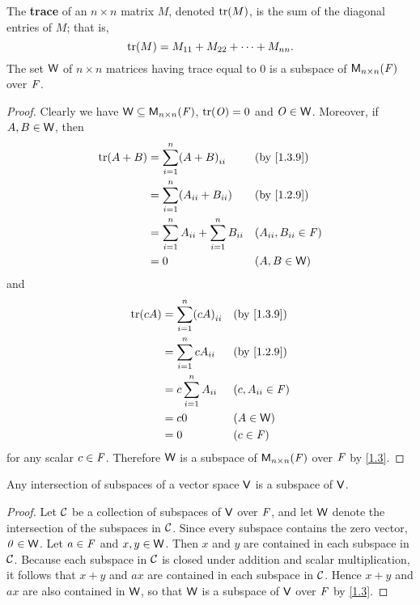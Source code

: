 \begin{eg}\label{1.3.9}
  The \textbf{trace} of an \(n \times n\) matrix \(M\), denoted \(\tr{M}\), is the sum of the diagonal entries of \(M\);
  that is,
  \[
    \tr{M} = M_{1 1} + M_{2 2} + \dots + M_{n n}.
  \]
  The set \(\mathsf{W}\) of \(n \times n\) matrices having trace equal to \(0\) is a subspace of \(\mathsf{M}_{{n} \times n}({\mathit{F}})\) over \(\mathit{F}\).
\end{eg}

\begin{proof}
  Clearly we have \(\mathsf{W} \subseteq \mathsf{M}_{{n} \times n}({\mathit{F}})\), \(\tr{\zm} = 0\) and \(\mathit{O} \in \mathsf{W}\).
  Moreover, if \(A, B \in \mathsf{W}\), then
  \begin{align*}
    \tr{A + B} & = \sum_{i = 1}^{n} \p{A + B}_{i i}                    &  & \text{(by \cref{1.3.9})}  \\
               & = \sum_{i = 1}^{n} \p{A_{i i} + B_{i i}}              &  & \text{(by \cref{1.2.9})}  \\
               & = \sum_{i = 1}^{n} A_{i i} + \sum_{i = 1}^{n} B_{i i} &  & (A_{i i}, B_{i i} \in \F) \\
               & = 0                                                   &  & (A, B \in \W)
  \end{align*}
  and
  \begin{align*}
    \tr{cA} & = \sum_{i = 1}^{n} \p{cA}_{i i} &  & \text{(by \cref{1.3.9})} \\
            & = \sum_{i = 1}^{n} cA_{i i}     &  & \text{(by \cref{1.2.9})} \\
            & = c \sum_{i = 1}^{n} A_{i i}    &  & (c, A_{i i} \in \F)      \\
            & = c0                            &  & (A \in \W)               \\
            & = 0                             &  & (c \in \F)
  \end{align*}
  for any scalar \(c \in \mathit{F}\).
  Therefore \(\mathsf{W}\) is a subspace of \(\mathsf{M}_{{n} \times n}({\mathit{F}})\) over \(\mathit{F}\) by \cref{1.3}.
\end{proof}

\begin{thm}\label{1.4}
  Any intersection of subspaces of a vector space \(\mathsf{V}\) is a subspace of \(\mathsf{V}\).
\end{thm}

\begin{proof}
  Let \(\mathcal{C}\) be a collection of subspaces of \(\mathsf{V}\) over \(\mathit{F}\), and let \(\mathsf{W}\) denote the intersection of the subspaces in \(\mathcal{C}\).
  Since every subspace contains the zero vector, \(\mathit{0} \in \mathsf{W}\).
  Let \(a \in \mathit{F}\) and \(x, y \in \mathsf{W}\).
  Then \(x\) and \(y\) are contained in each subspace in \(\mathcal{C}\).
  Because each subspace in \(\mathcal{C}\) is closed under addition and scalar multiplication, it follows that \(x + y\) and \(ax\) are contained in each subspace in \(\mathcal{C}\).
  Hence \(x + y\) and \(ax\) are also contained in \(\mathsf{W}\), so that \(\mathsf{W}\) is a subspace of \(\mathsf{V}\) over \(\mathit{F}\) by \cref{1.3}.
\end{proof}

